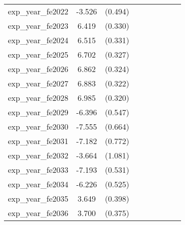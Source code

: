 {\begin{tabular}{l*{4}{cc}}
exp\_year\_fe2022&   -3.526\sym{***}&  (0.494)&                  &         &                  &         &                  &         \\
exp\_year\_fe2023&    6.419\sym{***}&  (0.330)&                  &         &                  &         &                  &         \\
exp\_year\_fe2024&    6.515\sym{***}&  (0.331)&                  &         &                  &         &                  &         \\
exp\_year\_fe2025&    6.702\sym{***}&  (0.327)&                  &         &                  &         &                  &         \\
exp\_year\_fe2026&    6.862\sym{***}&  (0.324)&                  &         &                  &         &                  &         \\
exp\_year\_fe2027&    6.883\sym{***}&  (0.322)&                  &         &                  &         &                  &         \\
exp\_year\_fe2028&    6.985\sym{***}&  (0.320)&                  &         &                  &         &                  &         \\
exp\_year\_fe2029&   -6.396\sym{***}&  (0.547)&                  &         &                  &         &                  &         \\
exp\_year\_fe2030&   -7.555\sym{***}&  (0.664)&                  &         &                  &         &                  &         \\
exp\_year\_fe2031&   -7.182\sym{***}&  (0.772)&                  &         &                  &         &                  &         \\
exp\_year\_fe2032&   -3.664\sym{***}&  (1.081)&                  &         &                  &         &                  &         \\
exp\_year\_fe2033&   -7.193\sym{***}&  (0.531)&                  &         &                  &         &                  &         \\
exp\_year\_fe2034&   -6.226\sym{***}&  (0.525)&                  &         &                  &         &                  &         \\
exp\_year\_fe2035&    3.649\sym{***}&  (0.398)&                  &         &                  &         &                  &         \\
exp\_year\_fe2036&    3.700\sym{***}&  (0.375)&                  &         &                  &         &                  &         \\

\end{tabular}}

